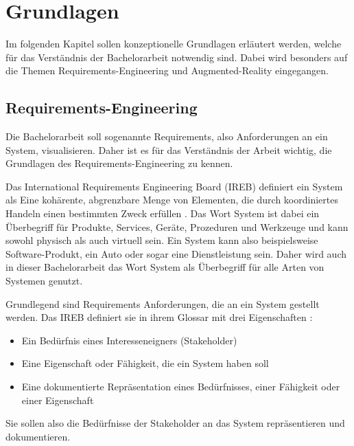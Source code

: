 \chapter{Grundlagen}

Im folgenden Kapitel sollen konzeptionelle Grundlagen erläutert werden, welche für das Verständnis der Bachelorarbeit notwendig sind.
Dabei wird besonders auf die Themen Requirements-Engineering und Augmented-Reality eingegangen.

  \section{Requirements-Engineering}
  Die Bachelorarbeit soll sogenannte Requirements, also Anforderungen an ein System, visualisieren.
  Daher ist es für das Verständnis der Arbeit wichtig, die Grundlagen des Requirements-Engineering zu kennen.


    Das International Requirements Engineering Board (IREB) definiert ein System als \glqq{}Eine kohärente, abgrenzbare Menge von Elementen, die durch koordiniertes Handeln einen bestimmten Zweck erfüllen\grqq{} \autocite[][]{ireb_cpre_glossary}.
    Das Wort System ist dabei ein Überbegriff für Produkte, Services, Geräte, Prozeduren und Werkzeuge und kann sowohl physisch als auch virtuell sein.
    Ein System kann also beispielsweise Software-Produkt, ein Auto oder sogar eine Dienstleistung sein.
    Daher wird auch in dieser Bachelorarbeit das Wort System als Überbegriff für alle Arten von Systemen genutzt.


    Grundlegend sind Requirements Anforderungen, die an ein System gestellt werden.
    Das IREB definiert sie in ihrem Glossar mit drei Eigenschaften \autocite[][Def. Anforderung]{ireb_cpre_glossary}:
    \begin{itemize}
        \item Ein Bedürfnis eines Interesseneigners (Stakeholder)
        \item Eine Eigenschaft oder Fähigkeit, die ein System haben soll
        \item Eine dokumentierte Repräsentation eines Bedürfnisses, einer Fähigkeit oder einer Eigenschaft
    \end{itemize}
    

    Sie sollen also die Bedürfnisse der Stakeholder an das System repräsentieren und dokumentieren.


